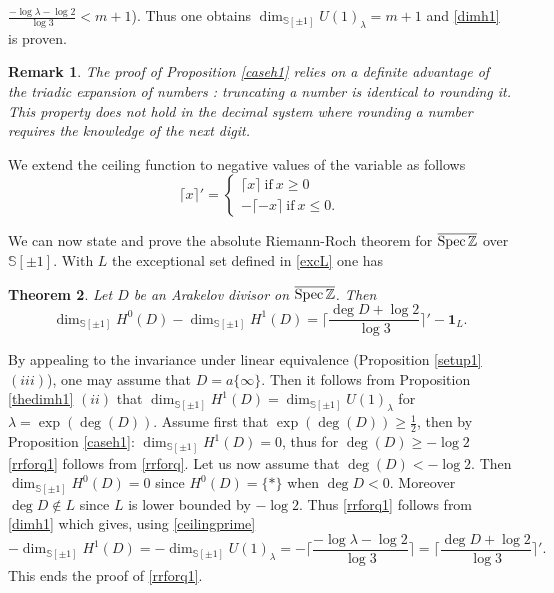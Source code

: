 \documentclass[cupthm]{CUP-JNL-JMJ}
\numberwithin{equation}{section}
\theoremstyle{cupplain}
\newtheorem{theorem}{Theorem}[section]
\theoremstyle{cupdefinition}
\theoremstyle{cupremark}
\newtheorem{remark}[theorem]{Remark}
\theoremstyle{cupproof}
\def\S{{\mathbb S}}
\def\Z{{\mathbb Z}}
\def\Spec{{\rm Spec\,}}
\def\sss{{\S}}
\def\spm{{\sss[\pm 1]}}
\def\spzb{{\overline{\Spec\Z}}}
\begin{document}
$\frac{-\log \lambda- \log 2}{\log 3}<m+1$). Thus one obtains $\dim_{\spm}U(1)_\lambda=m+1$ and  \eqref{dimh1} is proven.\endproof 
\begin{remark}\label{triadic}
The proof of Proposition \ref{caseh1} relies on  a definite advantage of the triadic expansion of numbers \cite{triadic}:  truncating a number is identical to rounding it. This property does not hold in the decimal system where rounding a number requires the knowledge of the next digit.
\end{remark}


We extend the ceiling function to negative values of the variable as follows
 \begin{equation}\label{ceilingprime}
\lceil x \rceil'	=\begin{cases} \lceil x \rceil\ \text{if}\ x\geq 0\\ 	-\lceil -x \rceil\ \text{if}\ x\leq  0.\end{cases}
\end{equation}
 
 We can now state and prove the absolute Riemann-Roch theorem for $\spzb$  over $\spm$. With $L$ the exceptional set defined in \eqref{excL} one has
 
 \begin{theorem}\label{rrspzb} 
Let $D$ be an Arakelov divisor  on $\spzb$. Then 
\begin{equation}\label{rrforq1}
\dim_{\spm}H^0(D)-\dim_{\spm}H^1(D)=\bigg\lceil \frac{\deg D+ \log 2}{\log 3}\bigg\rceil'	-{\mathbf 1}_L.
\end{equation}
\end{theorem}
 
 \proof  By appealing to the invariance under linear equivalence (Proposition \ref{setup1} $(iii)$), one may assume that $D=a\{\infty\}$. Then it follows from Proposition \ref{thedimh1} $(ii)$ that $\dim_{\spm}H^1(D)=\dim_{\spm}U(1)_\lambda$ for $\lambda=\exp(\deg(D))$. Assume first that $\exp(\deg(D))\geq \frac 12$, then by Proposition \ref{caseh1}: $\dim_{\spm}H^1(D)=0$, thus for $\deg(D)\geq -\log 2$ \eqref{rrforq1} follows from \eqref{rrforq}. Let us now assume that $\deg(D)< -\log 2$. Then $\dim_{\spm}H^0(D)=0$ since $H^0(D)=\{\ast\}$  when $\deg D<0$. Moreover  $\deg D\notin L$ since $L$ is lower bounded by $-\log 2$. Thus \eqref{rrforq1} follows from \eqref{dimh1} which gives, using \eqref{ceilingprime}
 \[
 -\dim_{\spm}H^1(D)=-\dim_{\spm}U(1)_\lambda=-\bigg\lceil \frac{-\log \lambda- \log 2}{\log 3}\bigg\rceil=\bigg\lceil \frac{\deg D+ \log 2}{\log 3}\bigg\rceil'.	
 \]
 This ends the proof of \eqref{rrforq1}. \endproof
 
\end{document}

